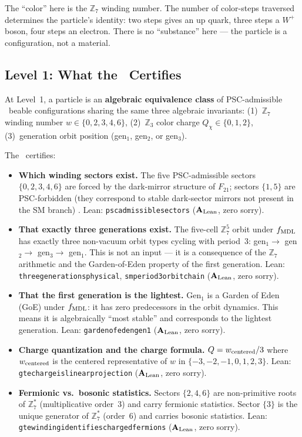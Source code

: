 \documentclass[11pt,openany]{book}
\theoremstyle{remark}
\newcommand{\ZS}{\mathbb{Z}_7}
\newcommand{\lean}[1]{%
  \penalty-100
  \begingroup\def\_{\textunderscore\allowbreak}\texttt{#1}\endgroup}
\newcommand{\CMCA}{\text{CMCA}}
\newcommand{\CatAL}{\ensuremath{\textbf{A}_{\rm Lean}}}
\begin{document}
The ``color'' here is the $\mathbb{Z}_7$ winding number.
The number of color-steps traversed determines the particle's identity:
two steps gives an up quark, three steps a $W^+$ boson, four steps an electron.
There is no ``substance'' here --- the particle is a configuration, not a material.

\subsection*{Level 1: What the \CMCA\ Certifies}

At Level~1, a particle is an \textbf{algebraic equivalence class} of PSC-admissible
\CMCA\ beable configurations sharing the same three algebraic invariants:
(1)~$\mathbb{Z}_7$ winding number $w \in \{0,2,3,4,6\}$,
(2)~$\mathbb{Z}_3$ color charge $Q_\chi \in \{0,1,2\}$,
(3)~generation orbit position (gen$_1$, gen$_2$, or gen$_3$).

The \CMCA\ certifies:

\begin{itemize}[itemsep=4pt]
\item \textbf{Which winding sectors exist.}
  The five PSC-admissible sectors $\{0,2,3,4,6\}$ are forced by the dark-mirror
  structure of $F_{21}$; sectors $\{1,5\}$ are PSC-forbidden (they correspond to
  stable dark-sector mirrors not present in the SM branch)
  \cite{SpivackCompleteness,SpivackPhiMDLField}.
  Lean: \lean{psc\_admissible\_sectors} (\CatAL, zero sorry).

\item \textbf{That exactly three generations exist.}
  The five-cell $\ZS^5$ orbit under $f_{\rm MDL}$ has exactly three non-vacuum
  orbit types cycling with period~3: gen$_1 \to$ gen$_2 \to$ gen$_3 \to$ gen$_1$.
  This is not an input --- it is a consequence of the $\mathbb{Z}_7$ arithmetic
  and the Garden-of-Eden property of the first generation.
  Lean: \lean{three\_generations\_physical}, \lean{sm\_period3\_orbit\_chain}
  (\CatAL, zero sorry).

\item \textbf{That the first generation is the lightest.}
  Gen$_1$ is a Garden of Eden (GoE) under $f_{\rm MDL}$: it has zero predecessors
  in the orbit dynamics.
  This means it is algebraically ``most stable'' and corresponds to the lightest
  generation.
  Lean: \lean{garden\_of\_eden\_gen1} (\CatAL, zero sorry).

\item \textbf{Charge quantization and the charge formula.}
  $Q = w_{\rm centered}/3$ where $w_{\rm centered}$ is the centered representative
  of $w$ in $\{-3,-2,-1,0,1,2,3\}$.
  Lean: \lean{gte\_charge\_is\_linear\_projection} (\CatAL, zero sorry).

\item \textbf{Fermionic vs.\ bosonic statistics.}
  Sectors $\{2,4,6\}$ are non-primitive roots of $\mathbb{Z}_7^*$ (multiplicative order~3)
  and carry fermionic statistics.
  Sector $\{3\}$ is the unique generator of $\mathbb{Z}_7^*$ (order~6) and carries
  bosonic statistics.
  Lean: \lean{gte\_winding\_identifies\_charged\_fermions} (\CatAL, zero sorry).
\end{itemize}
\end{document}

